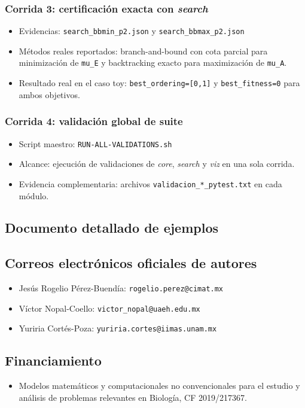 \documentclass[11pt]{article}
\begin{document}
\subsubsection*{Corrida 3: certificación exacta con \textit{search}}
\begin{itemize}
  \item Evidencias: \texttt{search\_bbmin\_p2.json} y \texttt{search\_bbmax\_p2.json}
  \item Métodos reales reportados: branch-and-bound con cota parcial para
  minimización de \texttt{mu\_E} y backtracking exacto para maximización de
  \texttt{mu\_A}.
  \item Resultado real en el caso toy: \texttt{best\_ordering=[0,1]} y
  \texttt{best\_fitness=0} para ambos objetivos.
\end{itemize}

\subsubsection*{Corrida 4: validación global de suite}
\begin{itemize}
  \item Script maestro: \texttt{RUN-ALL-VALIDATIONS.sh}
  \item Alcance: ejecución de validaciones de \textit{core}, \textit{search} y
  \textit{viz} en una sola corrida.
  \item Evidencia complementaria: archivos \texttt{validacion\_*\_pytest.txt} en
  cada módulo.
\end{itemize}

\subsection{Documento detallado de ejemplos}

\subsection{Correos electrónicos oficiales de autores}
\begin{itemize}
  \item Jesús Rogelio Pérez-Buendía: \texttt{rogelio.perez@cimat.mx}
  \item Víctor Nopal-Coello: \texttt{victor\_nopal@uaeh.edu.mx}
  \item Yuriria Cortés-Poza: \texttt{yuriria.cortes@iimas.unam.mx}
\end{itemize}

\subsection{Financiamiento}
\begin{itemize}
  \item Modelos matemáticos y computacionales no convencionales para el estudio y análisis de problemas relevantes en Biología, CF 2019/217367.
\end{itemize}
\end{document}
